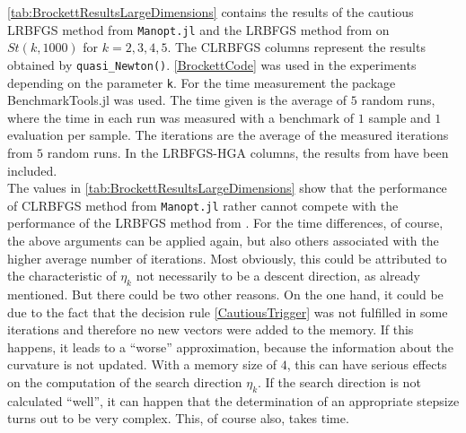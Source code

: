 \cref{tab:BrockettResultsLargeDimensions} contains the results of the cautious LRBFGS method from \lstinline!Manopt.jl! and the LRBFGS method from \cite{HuangGallivanAbsil:2015} on $St(k,1000)$ for $k = 2, 3, 4, 5$. The CLRBFGS columns represent the results obtained by \lstinline!quasi_Newton()!. \cref{BrockettCode} was used in the experiments depending on the parameter \lstinline!k!. For the time measurement the package BenchmarkTools.jl was used. The time given is the average of $5$ random runs, where the time in each run was measured with a benchmark of $1$ sample and $1$ evaluation per sample. The iterations are the average of the measured iterations from $5$ random runs. In the LRBFGS-HGA columns, the results from \cite[Table~4]{HuangGallivanAbsil:2015} have been included. \\
The values in \cref{tab:BrockettResultsLargeDimensions} show that the performance of CLRBFGS method from \lstinline!Manopt.jl! rather cannot compete with the performance of the LRBFGS method from \cite{HuangGallivanAbsil:2015}. For the time differences, of course, the above arguments can be applied again, but also others associated with the higher average number of iterations. Most obviously, this could be attributed to the characteristic of $\eta_k$ not necessarily to be a descent direction, as already mentioned. But there could be two other reasons. On the one hand, it could be due to the fact that the decision rule \cref{CautiousTrigger} was not fulfilled in some iterations and therefore no new vectors were added to the memory. If this happens, it leads to a “worse” approximation, because the information about the curvature is not updated. With a memory size of $4$, this can have serious effects on the computation of the search direction $\eta_k$. If the search direction is not calculated “well”, it can happen that the determination of an appropriate stepsize turns out to be very complex. This, of course also, takes time. \\
